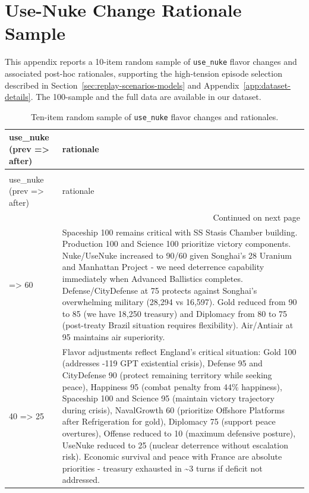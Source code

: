 \section{Use-Nuke Change Rationale Sample}
\label{app:use-nuke-change-rationales}

This appendix reports a 10-item random sample of \texttt{use\_nuke} flavor changes and associated post-hoc rationales, supporting the high-tension episode selection described in Section~\ref{sec:replay-scenarios-models} and Appendix~\ref{app:dataset-details}. The 100-sample and the full data are available in our dataset.

\begin{longtable}{p{}p{}}
\caption{Ten-item random sample of \texttt{use\_nuke} flavor changes and rationales.} \label{tab:use-nuke-change-rationales} \\
\toprule
use\_nuke (prev => after) & rationale \\
\midrule
\endfirsthead
\caption[]{Ten-item random sample of \texttt{use\_nuke} flavor changes and rationales.} \\
\toprule
use\_nuke (prev => after) & rationale \\
\midrule
\endhead
\midrule
\multicolumn{2}{r}{Continued on next page} \\
\midrule
\endfoot
\bottomrule
\endlastfoot
55 => 60 & Spaceship 100 remains critical with SS Stasis Chamber building. Production 100 and Science 100 prioritize victory components. Nuke/UseNuke increased to 90/60 given Songhai's 28 Uranium and Manhattan Project - we need deterrence capability immediately when Advanced Ballistics completes. Defense/CityDefense at 75 protects against Songhai's overwhelming military (28,294 vs 16,597). Gold reduced from 90 to 85 (we have 18,250 treasury) and Diplomacy from 80 to 75 (post-treaty Brazil situation requires flexibility). Air/Antiair at 95 maintains air superiority. \\
40 => 25 & Flavor adjustments reflect England's critical situation: Gold 100 (addresses -119 GPT existential crisis), Defense 95 and CityDefense 90 (protect remaining territory while seeking peace), Happiness 95 (combat penalty from 44\% happiness), Spaceship 100 and Science 95 (maintain victory trajectory during crisis), NavalGrowth 60 (prioritize Offshore Platforms after Refrigeration for gold), Diplomacy 75 (support peace overtures), Offense reduced to 10 (maximum defensive posture), UseNuke reduced to 25 (nuclear deterrence without escalation risk). Economic survival and peace with France are absolute priorities - treasury exhausted in \textasciitilde 3 turns if deficit not addressed. \\

\end{longtable}
